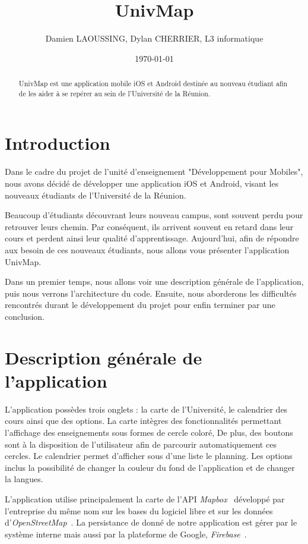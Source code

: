 \documentclass{article}
\title{UnivMap}
\author{Damien LAOUSSING, Dylan CHERRIER, L3 informatique}
\date{\today}
\begin{document}
\maketitle %


\begin{abstract}
  UnivMap est une application mobile iOS et Android destinée au nouveau
  étudiant afin de les aider à se repérer au sein de l'Université de la Réunion.
\end{abstract}


\section{Introduction}
\label{section:intro} %

Dans le cadre du projet de l'unité d'enseignement "Développement pour Mobiles", nous avons décidé de développer
une application iOS et Android, visant les nouveaux étudiants de l'Université de la Réunion.

Beaucoup d'étudiants découvrant leurs nouveau campus, sont souvent perdu pour retrouver leurs chemin. Par conséquent,
ils arrivent souvent en retard dans leur cours et perdent ainsi leur qualité d'apprentissage.
Aujourd'hui, afin de répondre aux besoin de ces nouveaux étudiants, nous allons vous présenter l'application UnivMap.

Dans un premier temps, nous allons voir une description générale de l'application, puis nous verrons
l'architecture du code. Ensuite, nous aborderons les difficultés rencontrés durant le développement
du projet pour enfin terminer par une conclusion.

\section{Description générale de l'application}


L'application possèdes trois onglets : la carte de l'Université, le calendrier des cours ainsi que des options.
La carte intègres des fonctionnalités permettant l'affichage des enseignements sous formes de cercle coloré, De plus,
des boutons sont à la disposition de l'utilisateur afin de parcourir automatiquement ces cercles.
Le calendrier permet d'afficher sous d'une liste le planning.
Les options inclus la possibilité de changer la couleur du fond de l'application et de changer la langues.

L'application utilise principalement la carte de l'API \textit{Mapbox}~\cite{mapboxDoc} développé par l'entreprise
du même nom sur les bases du logiciel libre et sur les données d'\textit{OpenStreetMap}~\cite{openstreetmapDoc}.
La persistance de donné de notre application est gérer par le système interne mais aussi par la plateforme
de Google, \textit{Firebase}~\cite{firebaseDoc}.
\end{document}
